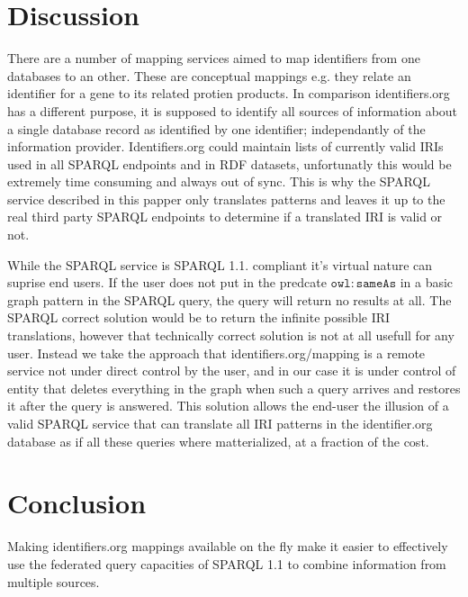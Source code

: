 \documentclass{bioinfo}
\begin{document}
\section{Discussion}

There are a number of mapping services aimed to map identifiers from one databases to an other.
These are conceptual mappings e.g. they relate an identifier for a gene to its related protien products.
In comparison identifiers.org has a different purpose, it is supposed to identify all sources of information about a single database record as identified by one identifier; independantly of the information provider.
Identifiers.org could maintain lists of currently valid IRIs used in all SPARQL endpoints and in RDF datasets,
unfortunatly this would be extremely time consuming and always out of sync.
This is why the SPARQL service described in this papper only translates patterns and leaves it up to the real third party SPARQL endpoints to determine if a translated IRI is valid or not.

While the SPARQL service is SPARQL 1.1. compliant it's virtual nature can suprise end users.
If the user does not put in the predcate $\mathtt{owl\colon{}sameAs}$ in a basic graph pattern in the SPARQL query, the query will return no results at all.
The SPARQL correct solution would be to return the infinite possible IRI translations,
however that technically correct solution is not at all usefull for any user.
Instead we take the approach that identifiers.org/mapping is a remote service not under direct control by the user,
and in our case it is under control of entity that deletes everything in the graph when such a query arrives and restores it after the query is answered.
This solution allows the end-user the illusion of a valid SPARQL service that can translate all IRI patterns in the identifier.org database as if all these
queries where matterialized, at a fraction of the cost. 









%
%






\section{Conclusion}
Making identifiers.org mappings available on the fly make it easier to effectively use the federated query capacities of SPARQL 1.1 to combine information from multiple sources.
\end{document}
